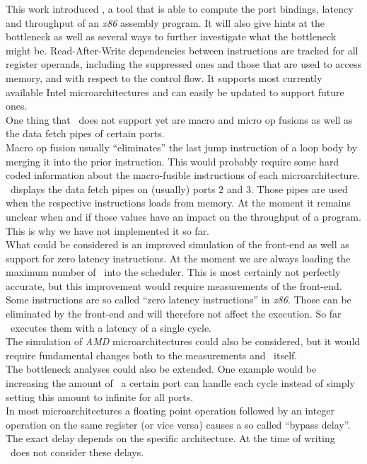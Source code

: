 This work introduced \suaca, a tool that is able to compute the port bindings, latency and throughput of an \emph{x86} assembly program. It will also give hints at the bottleneck as well as several ways to further investigate what the bottleneck might be. Read-After-Write dependencies between instructions are tracked for all register operands, including the suppressed ones and those that are used to access memory, and with respect to the control flow. It supports most currently available Intel microarchitectures and can easily be updated to support future ones.\\

One thing that \suaca\ does not support yet are macro and micro op fusions as well as the data fetch pipes of certain ports.\\
Macro op fusion usually ``eliminates'' the last jump instruction of a loop body by merging it into the prior instruction. This would probably require some hard coded information about the macro-fusible instructions of each microarchitecture.\\
\iaca\ displays the data fetch pipes on (usually) ports $2$ and $3$. Those pipes are used when the respective instructions loads from memory. At the moment it remains unclear when and if those values have an impact on the throughput of a program. This is why we have not implemented it so far.\\
What could be considered is an improved simulation of the front-end as well as support for zero latency instructions. At the moment we are always loading the maximum number of \microops\ into the scheduler. This is most certainly not perfectly accurate, but this improvement would require measurements of the front-end. Some instructions are so called ``zero latency instructions'' in \emph{x86}. Those can be eliminated by the front-end and will therefore not affect the execution. So far \suaca\ executes them with a latency of a single cycle.\\
The simulation of \emph{AMD} microarchitectures could also be considered, but it would require fundamental changes both to the measurements and \suaca\ itself.\\
The bottleneck analyses could also be extended. One example would be increasing the amount of \microops\ a certain port can handle each cycle instead of simply setting this amount to infinite for all ports.\\
In most microarchitectures a floating point operation followed by an integer operation on the same register (or vice versa) causes a so called ``bypass delay''. The exact delay depends on the specific architecture. At the time of writing \suaca\ does not consider these delays.\\

